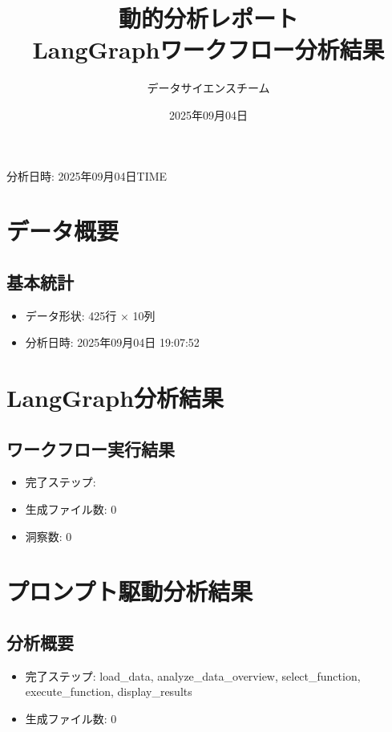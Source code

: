 \documentclass[11pt,a4paper]{article}
\title{\textbf{動的分析レポート} \\ LangGraphワークフロー分析結果}
\author{データサイエンスチーム}
\date{2025年09月04日}
\begin{document}
\maketitle

\vspace{-1cm}
\begin{center}
\large{分析日時: 2025年09月04日TIME}
\end{center}

\tableofcontents
\newpage


\section{データ概要}
\subsection{基本統計}
\begin{itemize}
\item データ形状: 425行 × 10列
\item 分析日時: 2025年09月04日 19:07:52
\end{itemize}


\section{LangGraph分析結果}
\subsection{ワークフロー実行結果}
\begin{itemize}
\item 完了ステップ: 
\item 生成ファイル数: 0
\item 洞察数: 0
\end{itemize}


\section{プロンプト駆動分析結果}
\subsection{分析概要}
\begin{itemize}
\item 完了ステップ: load_data, analyze_data_overview, select_function, execute_function, display_results
\item 生成ファイル数: 0
\end{itemize}
\end{document}
